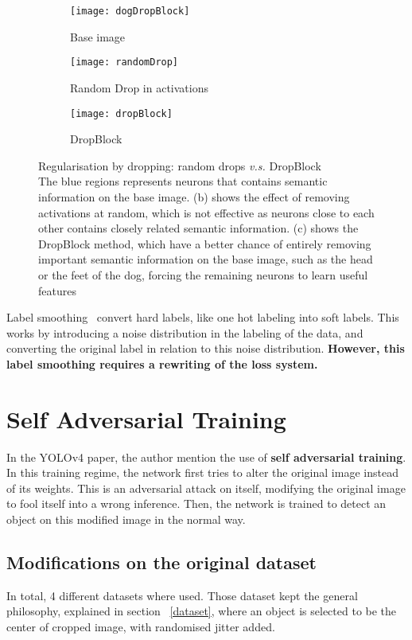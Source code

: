 \begin{figure}[H]
	\begin{subfigure}[t]{.3\textwidth}
  \centering
  \texttt{[image: dogDropBlock]}
  \caption{Base image}
  \label{fig:dropBlockA}
\end{subfigure}
	\begin{subfigure}[t]{.3\textwidth}
  \centering
  \texttt{[image: randomDrop]}  
  \caption{Random Drop in activations}
  \label{fig:dropBlockB}
\end{subfigure}
	\begin{subfigure}[t]{.3\textwidth}
  \centering
  \texttt{[image: dropBlock]}  
  \caption{DropBlock}
  \label{fig:dropBlockC}
\end{subfigure}
	\caption[Regularisation by dropping: random drops \textit{v.s.} DropBlock]{Regularisation by dropping: random drops \textit{v.s.} DropBlock\\The blue regions represents neurons that contains semantic information on the base image. (b) shows the effect of removing activations at random, which is not effective as neurons close to each other contains closely related semantic information. (c) shows the DropBlock method, which have a better chance of entirely removing important semantic information on the base image, such as the head or the feet of the dog, forcing the remaining neurons to learn useful features}
\label{fig:dropBlock}
\end{figure}

Label smoothing~\cite{labelSmooth} convert hard labels, like one hot labeling into soft labels. This works by introducing a noise distribution in the labeling of the data, and converting the original label in relation to this noise distribution. \textbf{However, this label smoothing requires a rewriting of the loss system.}

\section{Self Adversarial Training}
In the YOLOv4\cite{yolov4} paper, the author mention the use of \textbf{self adversarial training}. In this training regime, the network first tries to alter the original image instead of its weights. This is an adversarial attack on itself, modifying the original image to fool itself into a wrong inference. Then, the network is trained to detect an object on this modified image in the normal way.

\subsection{Modifications on the original dataset}
In total, 4 different datasets where used. Those dataset kept the general philosophy, explained in section ~\ref{dataset}, where an object is selected to be the center of cropped image, with randomised jitter added.

